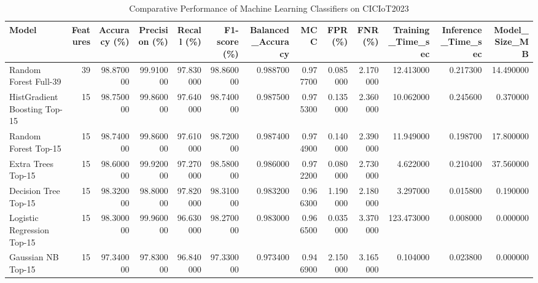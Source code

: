 \begin{table}
\caption{Comparative Performance of Machine Learning Classifiers on CICIoT2023}
\label{tab:classifier_comparison}
\begin{tabular}{lrrrrrrrrrrrr}
\toprule
Model & Features & Accuracy (\%) & Precision (\%) & Recall (\%) & F1-score (\%) & Balanced\_Accuracy & MCC & FPR (\%) & FNR (\%) & Training\_Time\_sec & Inference\_Time\_sec & Model\_Size\_MB \\
\midrule
Random Forest Full-39 & 39 & 98.870000 & 99.910000 & 97.830000 & 98.860000 & 0.988700 & 0.977700 & 0.085000 & 2.170000 & 12.413000 & 0.217300 & 14.490000 \\
HistGradientBoosting Top-15 & 15 & 98.750000 & 99.860000 & 97.640000 & 98.740000 & 0.987500 & 0.975300 & 0.135000 & 2.360000 & 10.062000 & 0.245600 & 0.370000 \\
Random Forest Top-15 & 15 & 98.740000 & 99.860000 & 97.610000 & 98.720000 & 0.987400 & 0.974900 & 0.140000 & 2.390000 & 11.949000 & 0.198700 & 17.800000 \\
Extra Trees Top-15 & 15 & 98.600000 & 99.920000 & 97.270000 & 98.580000 & 0.986000 & 0.972200 & 0.080000 & 2.730000 & 4.622000 & 0.210400 & 37.560000 \\
Decision Tree Top-15 & 15 & 98.320000 & 98.800000 & 97.820000 & 98.310000 & 0.983200 & 0.966300 & 1.190000 & 2.180000 & 3.297000 & 0.015800 & 0.190000 \\
Logistic Regression Top-15 & 15 & 98.300000 & 99.960000 & 96.630000 & 98.270000 & 0.983000 & 0.966500 & 0.035000 & 3.370000 & 123.473000 & 0.008000 & 0.000000 \\
Gaussian NB Top-15 & 15 & 97.340000 & 97.830000 & 96.840000 & 97.330000 & 0.973400 & 0.946900 & 2.150000 & 3.165000 & 0.104000 & 0.023800 & 0.000000 \\
\bottomrule
\end{tabular}
\end{table}
